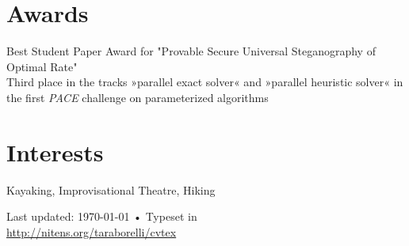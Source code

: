 \documentclass[10pt, a4paper]{article}
\newcommand{\years}[1]{\marginnote{\scriptsize #1}}
\begin{document}
\section*{Awards}
\years{2016}Best Student Paper Award for "Provable Secure Universal
Steganography of Optimal Rate"\\
\years{2016}Third place in the tracks »parallel exact
solver« and »parallel heuristic solver« in the first \emph{PACE}
challenge on parameterized algorithms

\section*{Interests}
Kayaking, Improvisational Theatre, Hiking


\vfill{}
\begin{center}

{\scriptsize  Last updated: \today\- •\- Typeset in \href{http://nitens.org/taraborelli/cvtex}{
 }\\
\href{http://nitens.org/taraborelli/cvtex}{http://nitens.org/taraborelli/cvtex}}
\end{center}
\end{document}
